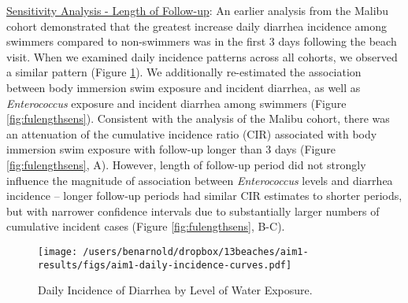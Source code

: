 \documentclass[12pt]{article}\usepackage[]{graphicx}\usepackage[]{color}
\begin{document}
\bigskip
\underline{Sensitivity Analysis - Length of Follow-up}: An earlier analysis from the Malibu cohort demonstrated that the greatest increase daily diarrhea incidence among swimmers compared to non-swimmers was in the first 3 days following the beach visit.\supercite{Arnold2013-xd} When we examined daily incidence patterns across all cohorts, we observed a similar pattern (Figure \ref{fig:dailydiar}). We additionally re-estimated the association between body immersion swim exposure and incident diarrhea, as well as \emph{Enterococcus} exposure and incident diarrhea among swimmers (Figure \ref{fig:fulengthsens}). Consistent with the analysis of the Malibu cohort,\supercite{Arnold2013-xd} there was an attenuation of the cumulative incidence ratio (CIR) associated with body immersion swim exposure with follow-up longer than 3 days (Figure \ref{fig:fulengthsens}, A). However, length of follow-up period did not strongly influence the magnitude of association between \emph{Enterococcus} levels and diarrhea incidence -- longer follow-up periods had similar CIR estimates to shorter periods, but with narrower confidence intervals due to substantially larger numbers of cumulative incident cases (Figure \ref{fig:fulengthsens}, B-C).

\begin{figure}[h!tb]
\begin{center}
\texttt{[image: /users/benarnold/dropbox/13beaches/aim1-results/figs/aim1-daily-incidence-curves.pdf]}
\caption{Daily Incidence of Diarrhea by Level of Water Exposure. \label{fig:dailydiar}}
\end{center}
\end{figure}
\end{document}
